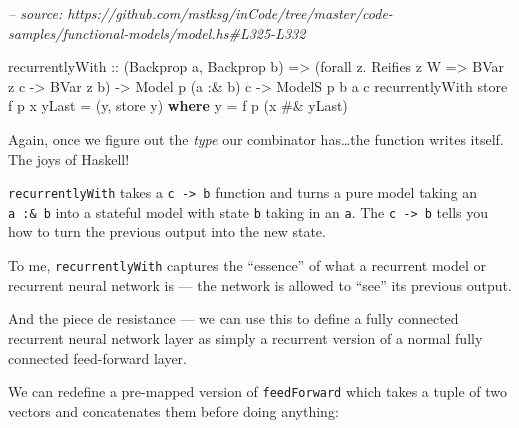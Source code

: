 \documentclass[]{article}
\newenvironment{Shaded}{}{}
\newcommand{\CommentTok}[1]{\textcolor[rgb]{0.38,0.63,0.69}{\textit{#1}}}
\newcommand{\DataTypeTok}[1]{\textcolor[rgb]{0.56,0.13,0.00}{#1}}
\newcommand{\FunctionTok}[1]{\textcolor[rgb]{0.02,0.16,0.49}{#1}}
\newcommand{\KeywordTok}[1]{\textcolor[rgb]{0.00,0.44,0.13}{\textbf{#1}}}
\newcommand{\NormalTok}[1]{#1}
\newcommand{\OtherTok}[1]{\textcolor[rgb]{0.00,0.44,0.13}{#1}}
\begin{document}
\begin{Shaded}
\begin{Highlighting}[]
\CommentTok{-- source: https://github.com/mstksg/inCode/tree/master/code-samples/functional-models/model.hs#L325-L332}

\NormalTok{recurrentlyWith}
\OtherTok{    ::}\NormalTok{ (}\DataTypeTok{Backprop}\NormalTok{ a, }\DataTypeTok{Backprop}\NormalTok{ b)}
    \OtherTok{=>}\NormalTok{ (forall z}\FunctionTok{.} \DataTypeTok{Reifies}\NormalTok{ z }\DataTypeTok{W} \OtherTok{=>} \DataTypeTok{BVar}\NormalTok{ z c }\OtherTok{->} \DataTypeTok{BVar}\NormalTok{ z b)}
    \OtherTok{->} \DataTypeTok{Model}\NormalTok{  p   (a }\FunctionTok{:&}\NormalTok{ b) c}
    \OtherTok{->} \DataTypeTok{ModelS}\NormalTok{ p b  a       c}
\NormalTok{recurrentlyWith store f p x yLast }\FunctionTok{=}\NormalTok{ (y, store y)}
  \KeywordTok{where}
\NormalTok{    y }\FunctionTok{=}\NormalTok{ f p (x }\FunctionTok{#&}\NormalTok{ yLast)}
\end{Highlighting}
\end{Shaded}

Again, once we figure out the \emph{type} our combinator has\ldots{}the function
writes itself. The joys of Haskell!

\texttt{recurrentlyWith} takes a \texttt{c\ -\textgreater{}\ b} function and
turns a pure model taking an \texttt{a\ :\&\ b} into a stateful model with state
\texttt{b} taking in an \texttt{a}. The \texttt{c\ -\textgreater{}\ b} tells you
how to turn the previous output into the new state.

To me, \texttt{recurrentlyWith} captures the ``essence'' of what a recurrent
model or recurrent neural network is --- the network is allowed to ``see'' its
previous output.

And the piece de resistance --- we can use this to define a fully connected
recurrent neural network layer as simply a recurrent version of a normal fully
connected feed-forward layer.

We can redefine a pre-mapped version of \texttt{feedForward} which takes a tuple
of two vectors and concatenates them before doing anything:
\end{document}
